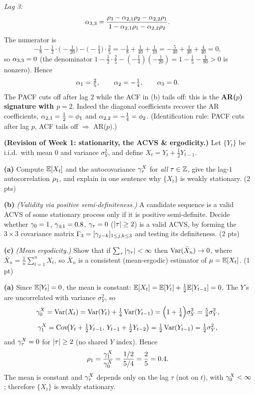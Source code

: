 \documentclass[11pt]{article}
\begin{document}
\emph{Lag 3:}
\[
\alpha_{3,3}=\frac{\rho_3-\alpha_{2,1}\rho_2-\alpha_{2,2}\rho_1}{1-\alpha_{2,1}\rho_1-\alpha_{2,2}\rho_2}.
\]
The numerator is
\[
-\tfrac18-\tfrac12\!\cdot\!\big(-\tfrac1{20}\big)-\big(-\tfrac14\big)\!\cdot\!\tfrac25
=-\tfrac18+\tfrac1{40}+\tfrac1{10}
=-\tfrac5{40}+\tfrac1{40}+\tfrac4{40}=0,
\]
so $\alpha_{3,3}=0$ (the denominator $1-\tfrac12\cdot\tfrac25-(-\tfrac14)(-\tfrac1{20})=1-\tfrac15-\tfrac1{80}>0$ is nonzero). Hence
\[
\alpha_1=\tfrac25,\qquad \alpha_2=-\tfrac14,\qquad \alpha_3=0.
\]
The PACF cuts off after lag $2$ while the ACF in (b) tails off: this is the \textbf{AR($p$) signature with $p=2$}. Indeed the diagonal coefficients recover the AR coefficients, $\alpha_{2,1}=\tfrac12=\phi_1$ and $\alpha_{2,2}=-\tfrac14=\phi_2$. (Identification rule: PACF cuts after lag $p$, ACF tails off $\Rightarrow$ AR($p$).)

\statementstart
\textbf{(Revision of Week 1: stationarity, the ACVS \& ergodicity.)} Let $\{Y_t\}$ be i.i.d.\ with mean $0$ and variance $\sigma_Y^2$, and define $X_t=Y_t+\tfrac12 Y_{t-1}$.

\textbf{(a)} Compute $\mathbb{E}[X_t]$ and the autocovariance $\gamma^X_\tau$ for \emph{all} $\tau\in\mathbb{Z}$, give the lag-$1$ autocorrelation $\rho_1$, and explain in one sentence why $\{X_t\}$ is weakly stationary. \hfill(2 pts)

\textbf{(b)} \emph{(Validity via positive semi-definiteness.)} A candidate sequence is a valid ACVS of some stationary process only if it is positive semi-definite. Decide whether $\gamma_0=1$, $\gamma_{\pm1}=0.8$, $\gamma_\tau=0$ ($\left\lvert \tau \right\rvert\ge2$) is a valid ACVS, by forming the $3\times3$ covariance matrix $\Gamma_3=[\gamma_{j-k}]_{1\le j,k\le3}$ and testing its definiteness. \hfill(2 pts)

\textbf{(c)} \emph{(Mean ergodicity.)} Show that if $\sum_{\tau}\left\lvert \gamma_\tau \right\rvert<\infty$ then $\operatorname{Var}(\bar X_n)\to0$, where $\bar X_n=\tfrac1n\sum_{t=1}^n X_t$, so $\bar X_n$ is a consistent (mean-ergodic) estimator of $\mu=\mathbb{E}[X_t]$. \hfill(1 pt)
\statementend

\textbf{(a)} Since $\mathbb{E}[Y_t]=0$, the mean is constant: $\mathbb{E}[X_t]=\mathbb{E}[Y_t]+\tfrac12\mathbb{E}[Y_{t-1}]=0$. The $Y$'s are uncorrelated with variance $\sigma_Y^2$, so
\[
\gamma^X_0=\operatorname{Var}(X_t)=\operatorname{Var}(Y_t)+\tfrac14\operatorname{Var}(Y_{t-1})=\Bigl(1+\tfrac14\Bigr)\sigma_Y^2=\tfrac54\sigma_Y^2,
\]
\[
\gamma^X_1=\operatorname{Cov}\!\bigl(Y_t+\tfrac12Y_{t-1},\,Y_{t-1}+\tfrac12Y_{t-2}\bigr)=\tfrac12\operatorname{Var}(Y_{t-1})=\tfrac12\sigma_Y^2,
\]
and $\gamma^X_\tau=0$ for $\left\lvert \tau \right\rvert\ge2$ (no shared $Y$ index). Hence
\[
\rho_1=\frac{\gamma^X_1}{\gamma^X_0}=\frac{1/2}{5/4}=\frac25=0.4 .
\]
The mean is constant and $\gamma^X_\tau$ depends only on the lag $\tau$ (not on $t$), with $\gamma^X_0<\infty$; therefore $\{X_t\}$ is weakly stationary.
\end{document}
